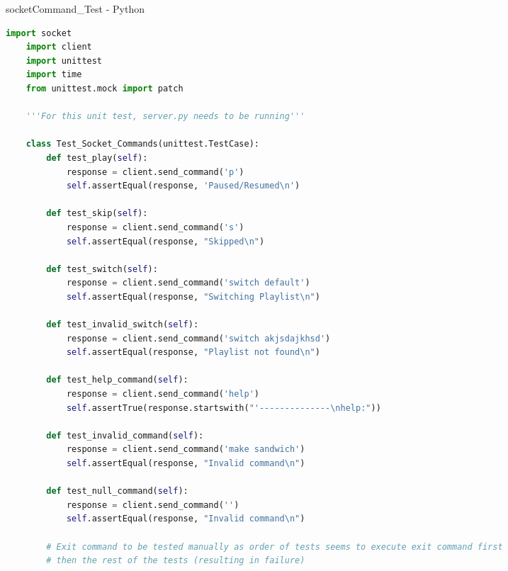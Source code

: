 \begin{algorithm}[H]
  \caption{socketCommand\_Test - Python}
  \label{alg:socketTest}
  \begin{lstlisting}[language=Python]
    import socket
    import client
    import unittest
    import time
    from unittest.mock import patch

    '''For this unit test, server.py needs to be running'''

    class Test_Socket_Commands(unittest.TestCase):
        def test_play(self):
            response = client.send_command('p')
            self.assertEqual(response, 'Paused/Resumed\n')
        
        def test_skip(self):
            response = client.send_command('s')
            self.assertEqual(response, "Skipped\n")
        
        def test_switch(self):
            response = client.send_command('switch default')
            self.assertEqual(response, "Switching Playlist\n")
            
        def test_invalid_switch(self):
            response = client.send_command('switch akjsdajkhsd')
            self.assertEqual(response, "Playlist not found\n")
            
        def test_help_command(self):
            response = client.send_command('help')
            self.assertTrue(response.startswith("'--------------\nhelp:"))
            
        def test_invalid_command(self):
            response = client.send_command('make sandwich')
            self.assertEqual(response, "Invalid command\n")
            
        def test_null_command(self):
            response = client.send_command('')
            self.assertEqual(response, "Invalid command\n")
            
        # Exit command to be tested manually as order of tests seems to execute exit command first
        # then the rest of the tests (resulting in failure)
  \end{lstlisting}
\end{algorithm}


